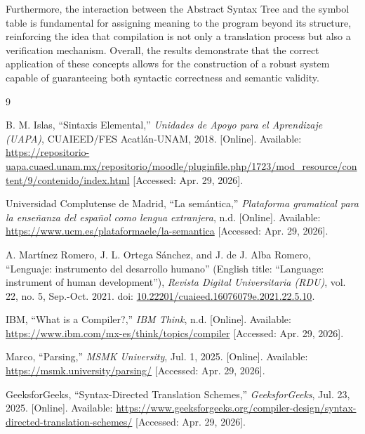 \documentclass[letterpaper,12pt,oneside]{article}
\begin{document}
\bigskip

Furthermore, the interaction between the Abstract Syntax Tree and the symbol table is fundamental for assigning meaning to the program beyond its structure, reinforcing the idea that compilation is not only a translation process but also a verification mechanism. Overall, the results demonstrate that the correct application of these concepts allows for the construction of a robust system capable of guaranteeing both syntactic correctness and semantic validity.


\begin{thebibliography}{9}

B. M. Islas, 
``Sintaxis Elemental,'' 
\emph{Unidades de Apoyo para el Aprendizaje (UAPA)}, 
CUAIEED/FES Acatlán-UNAM, 
2018. 
[Online]. Available: 
\url{https://repositorio-uapa.cuaed.unam.mx/repositorio/moodle/pluginfile.php/1723/mod_resource/content/9/contenido/index.html} 
[Accessed: Apr. 29, 2026].

Universidad Complutense de Madrid, 
``La semántica,'' 
\emph{Plataforma gramatical para la enseñanza del español como lengua extranjera}, 
n.d. 
[Online]. Available: 
\url{https://www.ucm.es/plataformaele/la-semantica} 
[Accessed: Apr. 29, 2026].

A. Martínez Romero, J. L. Ortega Sánchez, and J. de J. Alba Romero, 
``Lenguaje: instrumento del desarrollo humano'' (English title: ``Language: instrument of human development''), 
\emph{Revista Digital Universitaria (RDU)}, 
vol. 22, no. 5, 
Sep.-Oct. 2021. 
doi: \href{https://doi.org/10.22201/cuaieed.16076079e.2021.22.5.10}{10.22201/cuaieed.16076079e.2021.22.5.10}.

IBM, 
``What is a Compiler?,'' 
\emph{IBM Think}, 
n.d. 
[Online]. Available: 
\url{https://www.ibm.com/mx-es/think/topics/compiler} 
[Accessed: Apr. 29, 2026].

Marco, 
``Parsing,'' 
\emph{MSMK University}, 
Jul. 1, 2025. 
[Online]. Available: 
\url{https://msmk.university/parsing/} 
[Accessed: Apr. 29, 2026].

GeeksforGeeks, 
``Syntax-Directed Translation Schemes,'' 
\emph{GeeksforGeeks}, 
Jul. 23, 2025. 
[Online]. Available: 
\url{https://www.geeksforgeeks.org/compiler-design/syntax-directed-translation-schemes/} 
[Accessed: Apr. 29, 2026].

\end{thebibliography}
\end{document}

